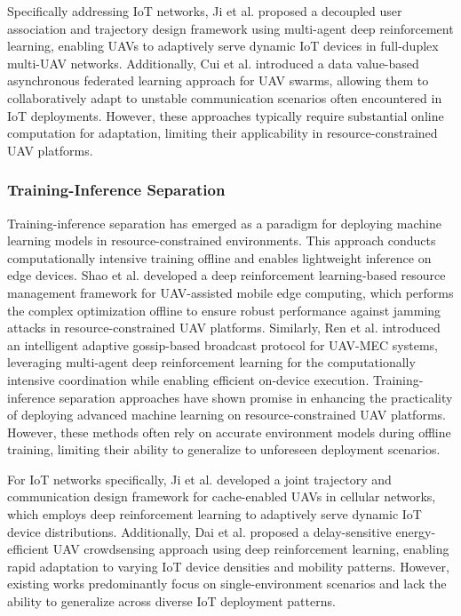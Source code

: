 \documentclass[10pt,conference,letterpaper]{IEEEtran}
\begin{document}
Specifically addressing IoT networks, Ji et al. \cite{DBLP:journals/tmc/JiZC23} proposed a decoupled user association and trajectory design framework using multi-agent deep reinforcement learning, enabling UAVs to adaptively serve dynamic IoT devices in full-duplex multi-UAV networks. Additionally, Cui et al. \cite{DBLP:journals/tmc/CuiYWFH24} introduced a data value-based asynchronous federated learning approach for UAV swarms, allowing them to collaboratively adapt to unstable communication scenarios often encountered in IoT deployments. However, these approaches typically require substantial online computation for adaptation, limiting their applicability in resource-constrained UAV platforms.

\subsubsection{Training-Inference Separation}

Training-inference separation has emerged as a paradigm for deploying machine learning models in resource-constrained environments. This approach conducts computationally intensive training offline and enables lightweight inference on edge devices. Shao et al. \cite{DBLP:journals/tmc/ShaoYXSCX24} developed a deep reinforcement learning-based resource management framework for UAV-assisted mobile edge computing, which performs the complex optimization offline to ensure robust performance against jamming attacks in resource-constrained UAV platforms. Similarly, Ren et al. \cite{DBLP:journals/tmc/RenLMLWZLD24} introduced an intelligent adaptive gossip-based broadcast protocol for UAV-MEC systems, leveraging multi-agent deep reinforcement learning for the computationally intensive coordination while enabling efficient on-device execution. Training-inference separation approaches have shown promise in enhancing the practicality of deploying advanced machine learning on resource-constrained UAV platforms. However, these methods often rely on accurate environment models during offline training, limiting their ability to generalize to unforeseen deployment scenarios.


For IoT networks specifically, Ji et al. \cite{DBLP:journals/tmc/JiZC23} developed a joint trajectory and communication design framework for cache-enabled UAVs in cellular networks, which employs deep reinforcement learning to adaptively serve dynamic IoT device distributions. Additionally, Dai et al. \cite{DBLP:journals/tmc/DaiLHWLT23} proposed a delay-sensitive energy-efficient UAV crowdsensing approach using deep reinforcement learning, enabling rapid adaptation to varying IoT device densities and mobility patterns. However, existing works predominantly focus on single-environment scenarios and lack the ability to generalize across diverse IoT deployment patterns.
\end{document}
